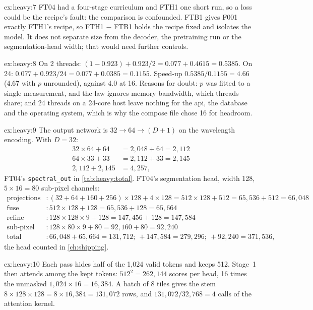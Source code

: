 \begin{solution}{ex:heavy:7}
FT04 had a four-stage curriculum and FTH1 one short run, so a loss could be the recipe's fault: the comparison is
confounded. FTB1 gives F001 exactly FTH1's recipe, so FTH1 $-$ FTB1 holds the recipe fixed and isolates the
model. It does not separate size from the decoder, the pretraining run or the segmentation-head width; that would
need further controls.
\end{solution}

\begin{solution}{ex:heavy:8}
On 2 threads: $(1-0.923)+0.923/2=0.077+0.4615=0.5385$. On 24: $0.077+0.923/24=0.077+0.0385=0.1155$. Speed-up
$0.5385/0.1155=4.66$ (4.67 with $p$ unrounded), against 4.0 at 16. Reasons for doubt: $p$ was fitted to a single
measurement, and the law ignores memory bandwidth, which threads share; and 24 threads on a 24-core host leave
nothing for the api, the database and the operating system, which is why the compose file chose 16 for headroom.
\end{solution}

\begin{solution}{ex:heavy:9}
The output network is $32\to64\to(D+1)$ on the wavelength encoding. With $D=32$:
\begin{align*}
32\times64+64 &= 2{,}048+64 = 2{,}112\\
64\times33+33 &= 2{,}112+33 = 2{,}145\\
2{,}112+2{,}145 &= 4{,}257,
\end{align*}
FT04's \texttt{spectral\_out} in \cref{tab:heavy:total}. FT04's segmentation head, width 128, $5\times16=80$ sub-pixel
channels:
\begin{align*}
\text{projections} &: (32+64+160+256)\times128+4\times128 = 512\times128+512 = 65{,}536+512 = 66{,}048\\
\text{fuse} &: 512\times128+128 = 65{,}536+128 = 65{,}664\\
\text{refine} &: 128\times128\times9+128 = 147{,}456+128 = 147{,}584\\
\text{sub-pixel} &: 128\times80\times9+80 = 92{,}160+80 = 92{,}240\\
\text{total} &: 66{,}048+65{,}664 = 131{,}712;\ +147{,}584 = 279{,}296;\ +92{,}240 = 371{,}536,
\end{align*}
the head counted in \cref{ch:shipping}.
\end{solution}

\begin{solution}{ex:heavy:10}
Each pass hides half of the 1,024 valid tokens and keeps 512. Stage~1 then attends among the kept tokens:
$512^2=262{,}144$ scores per head, 16 times the unmasked $1{,}024\times16=16{,}384$. A batch of 8 tiles gives the stem
$8\times128\times128=8\times16{,}384=131{,}072$ rows, and $131{,}072/32{,}768=4$ calls of the attention kernel.
\end{solution}

